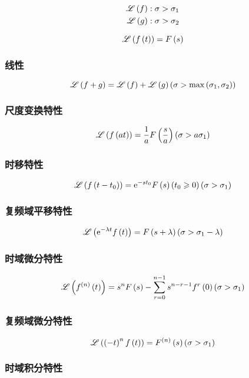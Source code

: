 \documentclass{article}
\begin{document}
\[\begin{aligned}
        \mathscr L\left(f\right) & :\sigma>\sigma_1 \\
        \mathscr L\left(g\right) & :\sigma>\sigma_2
    \end{aligned}\]

\[\mathscr L\left(f\left(t\right)\right)=F\left(s\right)\]

\subsubsection{线性}

\[\mathscr L\left(f+g\right)=\mathscr L\left(f\right)+\mathscr L\left(g\right)
    \left(\sigma>\max\left(\sigma_1,\sigma_2\right)\right)\]

\subsubsection{尺度变换特性}

\[\mathscr L\left(f\left(at\right)\right)=\frac1aF\left(\frac sa\right)
    \left(\sigma>a\sigma_1\right)\]

\subsubsection{时移特性}

\[\mathscr L\left(f\left(t-t_0\right)\right)=\mathrm e^{-st_0}F\left(s\right)\left(t_0\geqslant0\right)
    \left(\sigma>\sigma_1\right)\]

\subsubsection{复频域平移特性}

\[\mathscr L\left(\mathrm e^{-\lambda t}f\left(t\right)\right)=F\left(s+\lambda\right)
    \left(\sigma>\sigma_1-\lambda\right)\]

\subsubsection{时域微分特性}

\[\mathscr L\left(f^{\left(n\right)}\left(t\right)\right)=s^nF\left(s\right)-\sum_{r=0}^{n-1}s^{n-r-1}f^r\left(0\right)
    \left(\sigma>\sigma_1\right)\]

\subsubsection{复频域微分特性}

\[\mathscr L\left(\left(-t\right)^nf\left(t\right)\right)=F^{\left(n\right)}\left(s\right)
    \left(\sigma>\sigma_1\right)\]

\subsubsection{时域积分特性}
\end{document}
